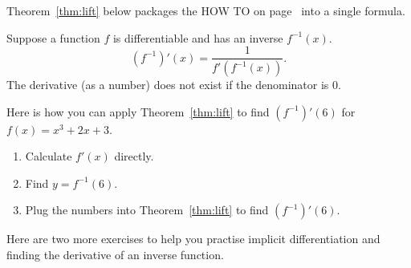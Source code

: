 \documentclass[../main.tex]{subfiles}
\begin{document}


%   
%   


Theorem~\ref{thm:lift} below packages the HOW TO on page~\pageref{technique:implicit-differentiation-inverse} into a single formula.


\begin{thm} \label{thm:lift}
  Suppose a function \(f\) is differentiable and has an inverse \(f^{-1}(x)\).
  \[
    \left(f^{-1}\right)'(x) = \frac{1}{f'(f^{-1}(x))}.
  \]
  The derivative (as a number) does not exist if the denominator is \(0\).

\end{thm}

\begin{exercise}
  Here is how you can apply Theorem~\ref{thm:lift} to find \((f^{-1})'(6)\) for \(f(x) = x^{3} + 2x + 3\).
  
  \begin{enumerate}[wide]
    \item Calculate \(f'(x)\) directly.

      
    \item Find \(y = f^{-1}(6)\).
      
    
    \item Plug the numbers into Theorem~\ref{thm:lift} to find \((f^{-1})'(6)\).

      \blanks*
  \end{enumerate}
\end{exercise}
\clearpage

Here are two more exercises to help you practise implicit differentiation and finding the derivative of an inverse function.
\end{document}
